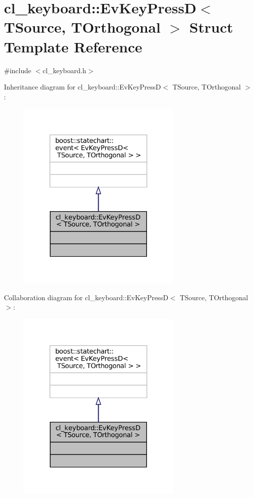 \hypertarget{structcl__keyboard_1_1EvKeyPressD}{}\section{cl\+\_\+keyboard\+:\+:Ev\+Key\+PressD$<$ T\+Source, T\+Orthogonal $>$ Struct Template Reference}
\label{structcl__keyboard_1_1EvKeyPressD}


{\ttfamily \#include $<$cl\+\_\+keyboard.\+h$>$}



Inheritance diagram for cl\+\_\+keyboard\+:\+:Ev\+Key\+PressD$<$ T\+Source, T\+Orthogonal $>$\+:
\nopagebreak
\begin{figure}[H]
\begin{center}
\leavevmode
\includegraphics[width=227pt]{structcl__keyboard_1_1EvKeyPressD__inherit__graph}
\end{center}
\end{figure}


Collaboration diagram for cl\+\_\+keyboard\+:\+:Ev\+Key\+PressD$<$ T\+Source, T\+Orthogonal $>$\+:
\nopagebreak
\begin{figure}[H]
\begin{center}
\leavevmode
\includegraphics[width=227pt]{structcl__keyboard_1_1EvKeyPressD__coll__graph}
\end{center}
\end{figure}


